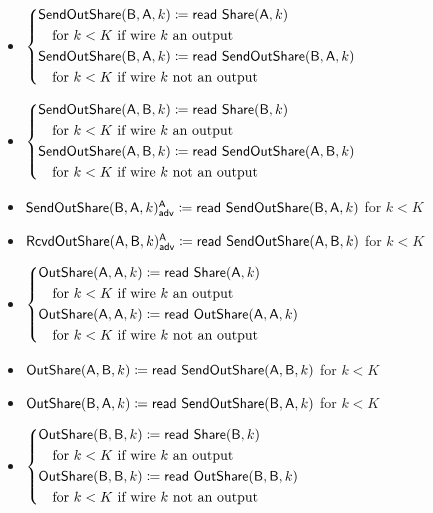 \begin{itemize}
\item $\begin{cases*} \SendOutShare(\B,\A,k) \coloneqq \read{\Share(\A,k)} \\ \hspace{10pt} \text{for $k < K$ if wire $k$ an output} \\ \SendOutShare(\B,\A,k) \coloneqq \read{\SendOutShare(\B,\A,k)} \\ \hspace{10pt} \text{for $k < K$ if wire $k$ not an output} \end{cases*}$
\item $\begin{cases*} \SendOutShare(\A,\B,k) \coloneqq \read{\Share(\B,k)} \\ \hspace{10pt} \text{for $k < K$ if wire $k$ an output} \\ \SendOutShare(\A,\B,k) \coloneqq \read{\SendOutShare(\A,\B,k)} \\ \hspace{10pt} \text{for $k < K$ if wire $k$ not an output} \end{cases*}$
\item {\color{blue} $\mathsf{SendOutShare}(\mathsf{B},\mathsf{A},k)^{\mathsf{A}}_{\mathsf{adv}} \coloneqq \mathsf{read} \ \mathsf{SendOutShare}(\mathsf{B},\mathsf{A},k)$ for $k < K$}
\item {\color{blue} $\mathsf{RcvdOutShare}(\mathsf{A},\mathsf{B},k)^{\mathsf{A}}_{\mathsf{adv}} \coloneqq \mathsf{read} \ \mathsf{SendOutShare}(\mathsf{A},\mathsf{B},k)$ for $k < K$}
\item $\begin{cases*} \OutShare(\A,\A,k) \coloneqq \read{\Share(\A,k)} \\ \hspace{10pt} \text{for $k < K$ if wire $k$ an output} \\ \OutShare(\A,\A,k) \coloneqq \read{\OutShare(\A,\A,k)} \\ \hspace{10pt} \text{for $k < K$ if wire $k$ not an output} \end{cases*}$
\item $\mathsf{OutShare}(\mathsf{A},\mathsf{B},k) \coloneqq \mathsf{read} \ \mathsf{SendOutShare}(\mathsf{A},\mathsf{B},k)$ for $k < K$
\item $\mathsf{OutShare}(\mathsf{B},\mathsf{A},k) \coloneqq \mathsf{read} \ \mathsf{SendOutShare}(\mathsf{B},\mathsf{A},k)$ for $k < K$
\item $\begin{cases*} \OutShare(\B,\B,k) \coloneqq \read{\Share(\B,k)} \\ \hspace{10pt} \text{for $k < K$ if wire $k$ an output} \\ \OutShare(\B,\B,k) \coloneqq \read{\OutShare(\B,\B,k)} \\ \hspace{10pt} \text{for $k < K$ if wire $k$ not an output} \end{cases*}$

\end{itemize}
